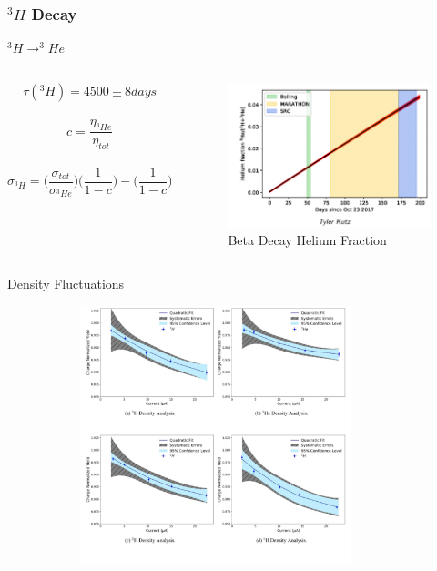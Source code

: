 \documentclass[12pt]{beamer}
\begin{document}
\begin{frame}
\frametitle{$^3H $ Decay}
\begin{block}{$^3H \rightarrow ^3He$}
	\begin{columns}
		\begin{equation*}
		\tau(^3H) = 4500 \pm 8 days
		\end{equation*}		 	
		\\
		\begin{equation*}
		c = \frac{\eta_{^3He}} {\eta_{tot}}
		\end{equation*}
		\\
		\begin{equation*}
		\sigma_{^3H} = \big(\frac{\sigma_{tot}}{\sigma_{^3He}}\big) \big(\frac{1}{1-c}\big) -  \big(\frac{1}{1-c}\big)  
		\end{equation*}
		\begin{figure}
			\caption*{Beta Decay Helium Fraction}
			\includegraphics[width=6cm]{../images/beta_decay.png}
		\end{figure}
	\end{columns}
\end{block}
\end{frame}





\begin{frame}{Density Fluctuations}
	\vspace{-17pt}
	\begin{figure}
		\includegraphics[width=10cm,height=7.50cm]{../images/density_cor.pdf}
		\vspace{-0.5cm}
		\caption*{\cite{denscor}}
	\end{figure}

\end{frame}
\end{document}
